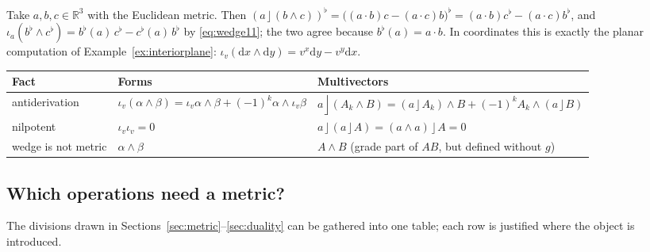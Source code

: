 \documentclass[11pt,a4paper]{article}
\renewcommand{\arraystretch}{1.25}
\numberwithin{equation}{section}
\theoremstyle{definition}
\theoremstyle{plain}
\newcommand{\R}{\mathbb{R}}
\newcommand{\dd}{\mathrm{d}}
\newcommand{\lc}{\mathbin{\rfloor}}
\begin{document}
\begin{example}\label{ex:lcvsiota}
Take $a,b,c\in\R^3$ with the Euclidean metric. Then $(a\lc(b\wedge c))^\flat=\bigl((a\!\cdot\!b)c-(a\!\cdot\!c)b\bigr)^\flat=(a\!\cdot\!b)c^\flat-(a\!\cdot\!c)b^\flat$, and
$\iota_a(b^\flat\wedge c^\flat)=b^\flat(a)\,c^\flat-c^\flat(a)\,b^\flat$ by \eqref{eq:wedge11}; the two agree because $b^\flat(a)=a\cdot b$. In coordinates this is exactly
the planar computation of Example~\ref{ex:interiorplane}: $\iota_v(\dd x\wedge\dd y)=v^x\dd y-v^y\dd x$.
\end{example}

\begin{synthesis}
\renewcommand{\arraystretch}{1.3}
\begin{center}\small
\begin{tabular}{@{}p{3.6cm}p{4.0cm}p{4.0cm}@{}}
\toprule
\textbf{Fact} & \textbf{Forms} & \textbf{Multivectors}\\
\midrule
antiderivation & $\iota_v(\alpha\wedge\beta)=\iota_v\alpha\wedge\beta+(-1)^k\alpha\wedge\iota_v\beta$ & $a\lc(A_k\wedge B)=(a\lc A_k)\wedge B+(-1)^kA_k\wedge(a\lc B)$\\
nilpotent & $\iota_v\iota_v=0$ & $a\lc(a\lc A)=(a\wedge a)\lc A=0$\\
wedge is not metric & $\alpha\wedge\beta$ & $A\wedge B$ (grade part of $AB$, but defined without $g$)\\
\bottomrule
\end{tabular}
\end{center}
\end{synthesis}

\subsection{Which operations need a metric?}\label{sec:whichmetric}

The divisions drawn in Sections~\ref{sec:metric}--\ref{sec:duality} can be gathered into one table; each row is justified where the
object is introduced.
\end{document}
